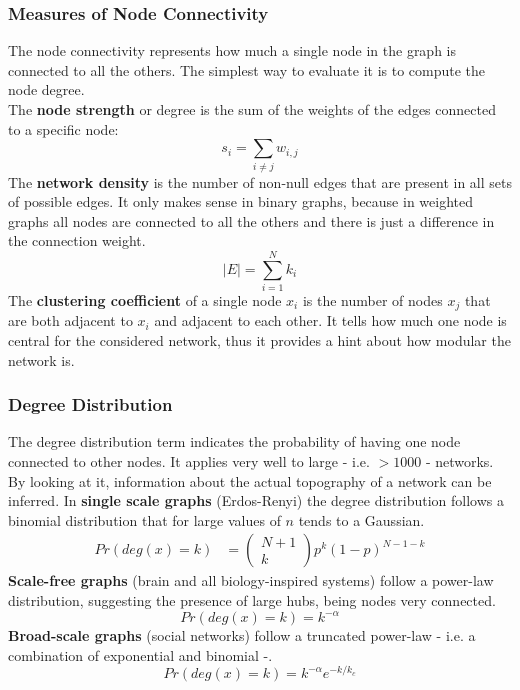 \subsubsection{Measures of Node Connectivity}
The node connectivity represents how much a single node in the graph is connected to all the others.
The simplest way to evaluate it is to compute the node degree.\\
The \textbf{node strength} or degree is the sum of the weights of the edges connected to a specific node:
\begin{equation*}
    s_i=\sum_{i\neq j}w_{i,j}
\end{equation*}
The \textbf{network density} is the number of non-null edges that are present in all sets of possible edges.
It only makes sense in binary graphs, because in weighted graphs all nodes are connected to all the others and
there is just a difference in the connection weight.
\begin{equation*}
    |E|=\sum_{i=1}^{N} k_i
\end{equation*}
The \textbf{clustering coefficient} of a single node \(x_i\) is the number of nodes \(x_j\) that are both adjacent to
\(x_i\) and adjacent to each other. It tells how much one node is central for the considered network, thus it provides
a hint about how modular the network is.
\subsubsection{Degree Distribution}
The degree distribution term indicates the probability of having one node connected to other nodes. It applies very well
to large - i.e. \(>1000\) - networks. By looking at it, information about the actual topography of a network
can be inferred. In \textbf{single scale graphs} (Erdos-Renyi) the degree distribution follows a binomial distribution
that for large values of \(n\) tends to a Gaussian.
\begin{align*}
    Pr(deg(x)=k) & = \begin{pmatrix}
                         N+1 \\
                         k
                     \end{pmatrix}
    p^k(1-p)^{N-1-k}
\end{align*}
\textbf{Scale-free graphs} (brain and all biology-inspired systems) follow a power-law distribution, suggesting the
presence of large hubs, being nodes very connected.
\begin{equation*}
    Pr(deg(x)=k)=k^{-\alpha}
\end{equation*}
\textbf{Broad-scale graphs} (social networks) follow a truncated power-law - i.e. a combination of exponential and binomial -.
\begin{equation*}
    Pr(deg(x)=k)=k^{-\alpha}e^{-k/k_c}
\end{equation*}
